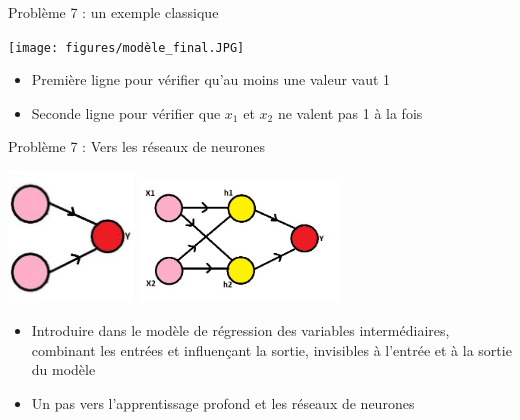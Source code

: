 \documentclass[10pt]{beamer}
\begin{document}
 
\begin{frame}{Problème 7 : un exemple classique} 

 \begin{center}
\texttt{[image: figures/modèle\_final.JPG]} 
\end{center} 

\begin{itemize}
           \item Première ligne pour vérifier qu'au moins une valeur vaut 1
           \item Seconde ligne pour vérifier que $x_1$ et $x_2$ ne valent pas 1 à la fois
        \end{itemize} 
 
\end{frame}
\begin{frame}{Problème 7 : Vers les réseaux de neurones} 

 \begin{center}
\includegraphics[width=0.25\textwidth]{figures/reg_RN.JPG}%
\hspace{0.15\textwidth}
\includegraphics[width=0.4\textwidth]{figures/Perceptron.JPG}
\end{center} 

\begin{itemize}
           \item Introduire dans le modèle de régression des variables intermédiaires, combinant les entrées et influençant la sortie, invisibles à l'entrée et à la sortie du modèle
           \item Un pas vers l'apprentissage profond et les réseaux de neurones  
        \end{itemize} 
 
\end{frame}
\end{document}
